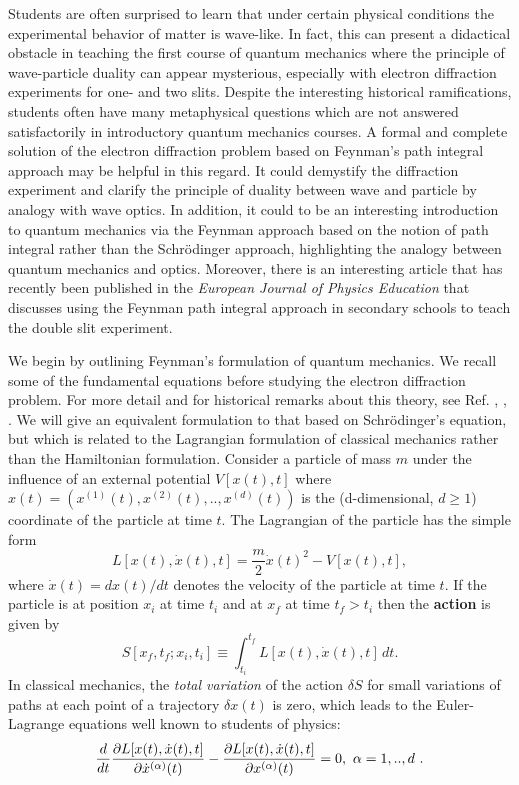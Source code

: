\documentclass[12pt]{article}   %
\begin{document}
Students are often surprised to learn that under certain
physical conditions the experimental behavior of matter is
wave-like. In fact, this can present a didactical obstacle in
teaching the first course of quantum mechanics where the
principle of wave-particle duality can appear mysterious,
especially with electron diffraction experiments for one- and
two slits. Despite the interesting historical ramifications,
students often have many metaphysical questions which are not
answered satisfactorily in introductory quantum mechanics
courses. A formal and complete solution of the electron
diffraction problem based on Feynman's path integral approach
may be helpful in this regard. It could demystify the
diffraction experiment and clarify the principle of duality
between wave and particle by analogy with wave optics. In
addition, it could to be an interesting introduction to quantum
mechanics via the Feynman approach based on the notion of path
integral rather than the Schr\"odinger approach, highlighting
the analogy between quantum mechanics and optics.
Moreover, there is an interesting article that has recently been published 
in the \textit{European Journal of Physics Education}
that discusses using the Feynman path integral approach in secondary schools 
to teach the double slit experiment.\cite{Fanaro} 



We begin by outlining Feynman's formulation of quantum mechanics.
We recall some of the fundamental equations before studying the
electron diffraction problem. For more detail and for historical
remarks about this theory, see Ref. \cite{FH},
\cite{Feynman2}, \cite{Feynman3}. We will give an equivalent formulation to that
based on Schr\"odinger's equation, but which is related to the
Lagrangian formulation of classical mechanics rather than the
Hamiltonian formulation. Consider a particle of mass $m$ under the
influence of an external potential $V[x(t),t]$ 
where $x(t)=(x^{(1)}(t),x^{(2)}(t),..,x^{(d)}(t))$ is the
(d-dimensional, $d\geq1$) coordinate of the particle at time $t$. The Lagrangian of
the particle has the simple form $$ L[x(t),\dot{x}(t),t] =
\frac{m}{2}\dot{x}(t)^2-V[x(t),t],
$$ where $\dot{x}(t) = dx(t)/dt$ denotes the velocity of the
particle at time $t$. If the particle is at position $x_i$ at time
$t_i$ and at $x_f$ at time $t_f>t_i$ then the \textbf{action} is
given by 
$$ S[x_f,t_f;x_i,t_i] \equiv
\int_{t_i}^{t_f} L[x(t),\dot{x}(t),t]\, dt. $$ 
In classical mechanics, the \textit{total variation} of the action $ \delta S $
for small variations of paths at each point of a trajectory
$\delta x(t) $ is zero, which leads to the Euler-Lagrange
equations well known to students of physics:
\begin{eqnarray*}
{d \over dt}{\partial L[x(t),\dot{x}(t),t]  \over
\partial\dot{x}^{(\alpha)}(t)} - {\partial L[x(t),\dot{x}(t),t]  \over
\partial x^{(\alpha)}(t)} = 0,\ \alpha=1,..,d\ .
\end{eqnarray*}
\end{document}
